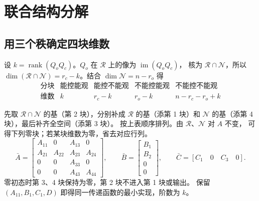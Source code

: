 \documentclass[UTF8,a4paper,12pt,fontset=fandol]{ctexart}
\DeclareMathOperator{\rank}{rank}
\DeclareMathOperator{\im}{im}
\begin{document}
\newpage
\section{联合结构分解}\label{sec:kalman}

\subsection*{用三个秩确定四块维数}
设 $k=\rank(Q_oQ_c)$。$Q_o$ 在 $\mathcal R$ 上的像为 $\im(Q_oQ_c)$，
核为 $\mathcal R\cap\mathcal N$，所以
$\dim(\mathcal R\cap\mathcal N)=r_c-k$。结合 $\dim\mathcal N=n-r_o$ 得
\[
\begin{array}{c|cccc}
 \text{分块} & \text{能控能观} & \text{能控不能观} & \text{不能控能观} & \text{不能控不能观}\\
 \hline
 \text{维数} & k & r_c-k & r_o-k & n-r_c-r_o+k
\end{array}
\]

先取 $\mathcal R\cap\mathcal N$ 的基（第 2 块），分别补成 $\mathcal R$ 的基（添第 1 块）和
$\mathcal N$ 的基（添第 4 块），最后补齐全空间（添第 3 块）。
按上表顺序排列。由 $\mathcal R$、$\mathcal N$ 对 $A$ 不变，
可得下列零块；若某块维数为零，省去对应行列。
\[
  \bar A=\begin{bmatrix}
  A_{11}&0&A_{13}&0\\
  A_{21}&A_{22}&A_{23}&A_{24}\\
  0&0&A_{33}&0\\
  0&0&A_{43}&A_{44}
  \end{bmatrix},\qquad
  \bar B=\begin{bmatrix}B_1\\B_2\\0\\0\end{bmatrix},\qquad
  \bar C=[C_1\quad0\quad C_3\quad0].
\]
零初态时第 3、4 块保持为零，第 2 块不进入第 1 块或输出。
保留 $(A_{11},B_1,C_1,D)$ 即得同一传递函数的最小实现，阶数为 $k$。
\end{document}
